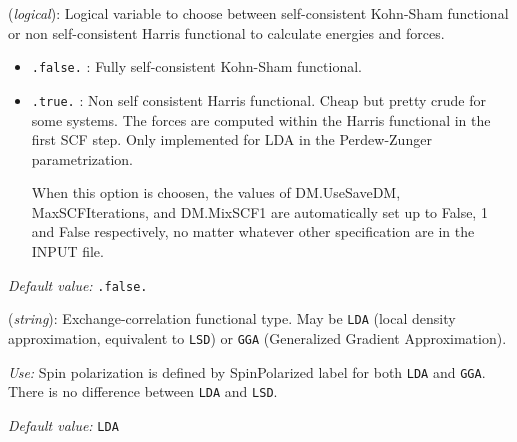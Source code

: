 \documentclass[11pt]{article}
\begin{document}
\begin{description}
\itemsep 10pt
\parsep 0pt

\item[{\bf Harris\_functional}] ({\it logical}): 
Logical variable to choose between self-consistent Kohn-Sham functional or
 non self-consistent Harris functional to calculate energies and forces. 
\begin{itemize}
\item {\tt .false.} : Fully self-consistent Kohn-Sham functional. 
\item {\tt .true.} : Non self consistent Harris functional. Cheap but
pretty crude for some systems. The forces are computed within the
Harris functional in the first SCF step. Only implemented for LDA in
the Perdew-Zunger parametrization.

When this option is choosen, the values of DM.UseSaveDM,
MaxSCFIterations, and DM.MixSCF1 are automatically set up to False, 1
and False respectively, no matter whatever other specification are in
the INPUT file.
\end{itemize}
    
{\it Default value:} {\tt .false.} 

\item[{\bf XC.functional}] ({\it string}): 
Exchange-correlation functional type. May be {\tt LDA} 
(local density approximation, equivalent to {\tt LSD}) or 
{\tt GGA} (Generalized Gradient Approximation). 

{\it Use:} Spin polarization is defined by SpinPolarized label for
both {\tt LDA} and {\tt GGA}. There is no difference between {\tt LDA}
and {\tt LSD}.

{\it Default value:} {\tt LDA}
        


\end{description}
\end{document}
